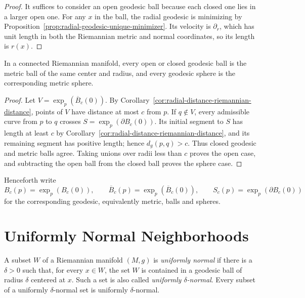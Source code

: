 \begin{proof}
\sketch
It suffices to consider an open geodesic ball because each closed one lies in
a larger open one.  For any $x$ in the ball, the radial geodesic is minimizing
by Proposition~\ref{prop:radial-geodesic-unique-minimizer}.  Its velocity is
$\partial_r$, which has unit length in both the Riemannian metric and normal
coordinates, so its length is $r(x)$.
\end{proof}

\begin{corollary}
\label{cor:geodesic-ball-metric-ball}
\leanok
{}

In a connected Riemannian manifold, every open or closed geodesic ball is the
metric ball of the same center and radius, and every geodesic sphere is the
corresponding metric sphere.
\end{corollary}

\begin{proof}
\sketch
Let $V=\exp_p(\overline B_c(0))$.  By
Corollary~\ref{cor:radial-distance-riemannian-distance}, points of $V$ have
distance at most $c$ from $p$.  If $q\notin V$, every admissible curve from
$p$ to $q$ crosses $S=\exp_p(\partial B_c(0))$.  Its initial segment to $S$
has length at least $c$ by
Corollary~\ref{cor:radial-distance-riemannian-distance}, and its remaining
segment has positive length; hence $d_g(p,q)>c$.  Thus closed geodesic and
metric balls agree.  Taking unions over radii less than $c$ proves the open
case, and subtracting the open ball from the closed ball proves the sphere
case.
\end{proof}

Henceforth write
\[
B_c(p)=\exp_p(B_c(0)),
\qquad
\overline B_c(p)=\exp_p(\overline B_c(0)),
\qquad
S_c(p)=\exp_p(\partial B_c(0))
\]
for the corresponding geodesic, equivalently metric, balls and spheres.
\section{Uniformly Normal Neighborhoods}

A subset $W$ of a Riemannian manifold $(M,g)$ is \emph{uniformly normal} if
there is a $\delta>0$ such that, for every $x\in W$, the set $W$ is contained
in a geodesic ball of radius $\delta$ centered at $x$. Such a set is also called
\emph{uniformly $\delta$-normal}. Every subset of a uniformly
$\delta$-normal set is uniformly $\delta$-normal.

